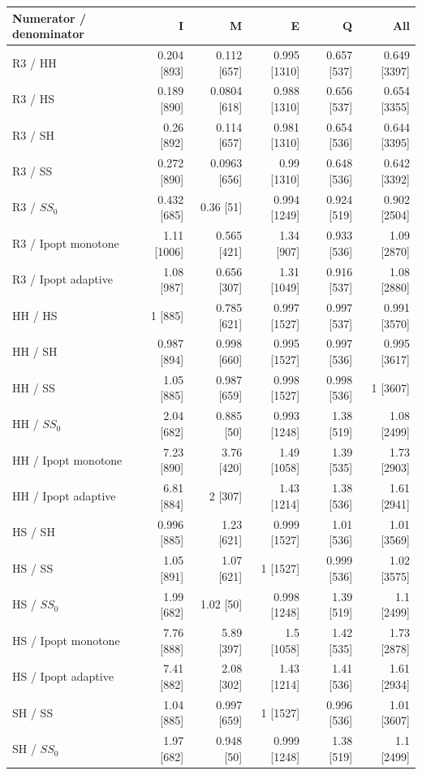 \begin{tabular}{@{}lrrrrr@{}}
\toprule
Numerator / denominator & I & M & E & Q & All\\
\midrule
R3 / HH & 0.204 [893] & 0.112 [657] & 0.995 [1310] & 0.657 [537] & 0.649 [3397]\\
R3 / HS & 0.189 [890] & 0.0804 [618] & 0.988 [1310] & 0.656 [537] & 0.654 [3355]\\
R3 / SH & 0.26 [892] & 0.114 [657] & 0.981 [1310] & 0.654 [536] & 0.644 [3395]\\
R3 / SS & 0.272 [890] & 0.0963 [656] & 0.99 [1310] & 0.648 [536] & 0.642 [3392]\\
R3 / $SS_0$ & 0.432 [685] & 0.36 [51] & 0.994 [1249] & 0.924 [519] & 0.902 [2504]\\
R3 / Ipopt monotone & 1.11 [1006] & 0.565 [421] & 1.34 [907] & 0.933 [536] & 1.09 [2870]\\
R3 / Ipopt adaptive & 1.08 [987] & 0.656 [307] & 1.31 [1049] & 0.916 [537] & 1.08 [2880]\\
HH / HS & 1 [885] & 0.785 [621] & 0.997 [1527] & 0.997 [537] & 0.991 [3570]\\
HH / SH & 0.987 [894] & 0.998 [660] & 0.995 [1527] & 0.997 [536] & 0.995 [3617]\\
HH / SS & 1.05 [885] & 0.987 [659] & 0.998 [1527] & 0.998 [536] & 1 [3607]\\
HH / $SS_0$ & 2.04 [682] & 0.885 [50] & 0.993 [1248] & 1.38 [519] & 1.08 [2499]\\
HH / Ipopt monotone & 7.23 [890] & 3.76 [420] & 1.49 [1058] & 1.39 [535] & 1.73 [2903]\\
HH / Ipopt adaptive & 6.81 [884] & 2 [307] & 1.43 [1214] & 1.38 [536] & 1.61 [2941]\\
HS / SH & 0.996 [885] & 1.23 [621] & 0.999 [1527] & 1.01 [536] & 1.01 [3569]\\
HS / SS & 1.05 [891] & 1.07 [621] & 1 [1527] & 0.999 [536] & 1.02 [3575]\\
HS / $SS_0$ & 1.99 [682] & 1.02 [50] & 0.998 [1248] & 1.39 [519] & 1.1 [2499]\\
HS / Ipopt monotone & 7.76 [888] & 5.89 [397] & 1.5 [1058] & 1.42 [535] & 1.73 [2878]\\
HS / Ipopt adaptive & 7.41 [882] & 2.08 [302] & 1.43 [1214] & 1.41 [536] & 1.61 [2934]\\
SH / SS & 1.04 [885] & 0.997 [659] & 1 [1527] & 0.996 [536] & 1.01 [3607]\\
SH / $SS_0$ & 1.97 [682] & 0.948 [50] & 0.999 [1248] & 1.38 [519] & 1.1 [2499]\\

\end{tabular}
